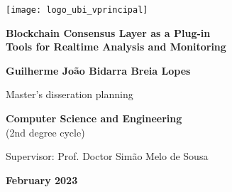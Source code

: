 \begin{titlepage}
\begin{center}

\begin{flushright}
 \texttt{[image: logo\_ubi\_vprincipal]}\\


\vspace{7.6cm}

\rostotitulo \textbf{Blockchain Consensus Layer as a Plug-in} \\
\rostosubtit \textbf{Tools for Realtime Analysis and Monitoring}\\

\vspace{1.8cm}

\rostonomes \textbf{Guilherme João Bidarra Breia Lopes}\\

\vspace{1.4cm}


\rostooutros Master's disseration planning

\rostonomes \textbf{Computer Science and Engineering}\\
\rostooutros (2nd degree cycle)\\

\vspace{3.3cm}

\rostooutros Supervisor: Prof. Doctor Simão Melo de Sousa\\

\vspace{1.4cm}

\rostooutros \textbf{February 2023}

\end{flushright}

\end{center}
\end{titlepage}
